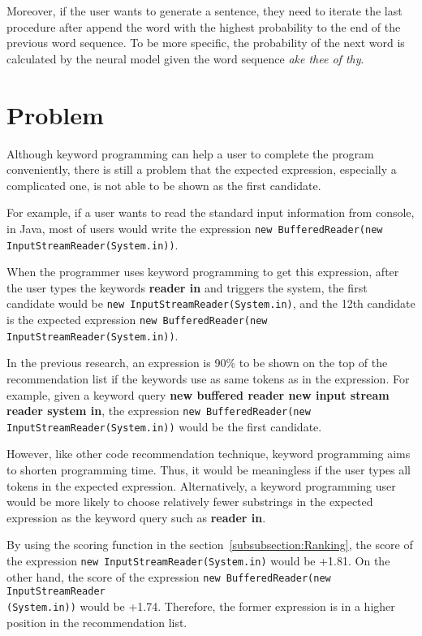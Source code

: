 \documentclass[PRO,english]{ipsj}
\begin{document}
Moreover, if the user wants to generate a sentence, they need to iterate the last procedure after append the word with the highest probability to the end of the previous word sequence. To be more specific, the probability of the next word is calculated by the neural model given the word sequence \textit{ake thee of thy}.


\section{Problem}\label{sec:problem}
Although keyword programming can help a user to complete the program conveniently, there is still a problem that the expected expression, especially a complicated one, is not able to be shown as the first candidate.

For example, if a user wants to read the standard input information from console, in Java, most of users would write the expression \texttt{new BufferedReader(new InputStreamReader(System.in))}. 

When the programmer uses keyword programming to get this expression, after the user types the keywords \textbf{reader in} and triggers the system, the first candidate would be \texttt{new InputStreamReader(System.in)}, and the 12th candidate is the expected expression \texttt{new BufferedReader(new InputStreamReader(System.in))}. 



In the previous research, an expression is 90\% to be shown on the top of the recommendation list if the keywords use as same tokens as in the expression. For example, given a keyword query \textbf{new buffered reader new input stream reader system in}, the expression \texttt{new BufferedReader(new InputStreamReader(System.in))} would be the first candidate.

However, like other code recommendation technique, keyword programming aims to shorten programming time. Thus, it would be meaningless if the user types all tokens in the expected expression. Alternatively, a keyword programming user would be more likely to choose relatively fewer substrings in the expected expression as the keyword query such as \textbf{reader in}. 

By using the scoring function in the section~\ref{subsubsection:Ranking}, the score of the expression \texttt{new InputStreamReader(System.in)} would be +1.81. On the other hand, the score of the expression \texttt{new BufferedReader(new InputStreamReader}\\\texttt{(System.in))} would be +1.74. Therefore, the former expression is in a higher position in the recommendation list.
\end{document}
